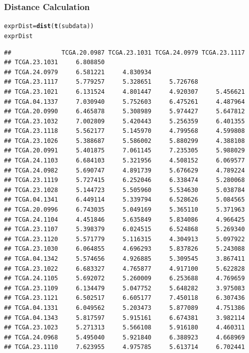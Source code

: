 \documentclass[UTF8]{beamer}\usepackage[]{graphicx}\usepackage[]{color}
\makeatletter
\newcommand{\hlstd}[1]{\textcolor[rgb]{0.345,0.345,0.345}{#1}}%
\newcommand{\hlkwb}[1]{\textcolor[rgb]{0.69,0.353,0.396}{#1}}%
\newcommand{\hlkwd}[1]{\textcolor[rgb]{0.737,0.353,0.396}{\textbf{#1}}}%
\newenvironment{kframe}{%
 \def\at@end@of@kframe{}%
 \ifinner\ifhmode%
  \def\at@end@of@kframe{\end{minipage}}%
  \begin{minipage}{\columnwidth}%
 \fi\fi%
 \def\FrameCommand##1{\hskip\@totalleftmargin \hskip-\fboxsep
 \colorbox{shadecolor}{##1}\hskip-\fboxsep
     \hskip-\linewidth \hskip-\@totalleftmargin \hskip\columnwidth}%
 \MakeFramed {\advance\hsize-\width
   \@totalleftmargin\z@ \linewidth\hsize
   \@setminipage}}%
 {\par\unskip\endMakeFramed%
 \at@end@of@kframe}
\newenvironment{knitrout}{}{} %
\makeatother
\begin{document}
\begin{frame}[fragile]
  \frametitle{Distance Calculation}
\tiny
\begin{knitrout}
\color{fgcolor}\begin{kframe}
\begin{alltt}
 \hlstd{exprDist} \hlkwb{=} \hlkwd{dist}\hlstd{(}\hlkwd{t}\hlstd{(subdata))}
 \hlstd{exprDist}
\end{alltt}
\begin{verbatim}
##              TCGA.20.0987 TCGA.23.1031 TCGA.24.0979 TCGA.23.1117
## TCGA.23.1031     6.808850                                       
## TCGA.24.0979     6.581221     4.830934                          
## TCGA.23.1117     5.779257     5.328651     5.726768             
## TCGA.23.1021     6.131524     4.801447     4.920307     5.456621
## TCGA.04.1337     7.030940     5.752603     6.475261     4.487964
## TCGA.20.0990     6.465878     5.308989     5.974427     5.647812
## TCGA.23.1032     7.002809     5.420443     5.256359     6.401355
## TCGA.23.1118     5.562177     5.145970     4.799568     4.599808
## TCGA.23.1026     5.388687     5.586002     5.880299     4.388108
## TCGA.20.0991     5.401875     7.061145     7.235305     5.988029
## TCGA.24.1103     6.684103     5.321956     4.508152     6.069577
## TCGA.24.0982     5.690747     4.891739     5.676629     4.789224
## TCGA.23.1119     5.727415     6.252046     6.338474     5.280068
## TCGA.23.1028     5.144723     5.505960     5.534630     5.038784
## TCGA.04.1341     6.449114     5.339794     6.528626     5.084565
## TCGA.20.0996     6.743035     5.049169     5.365110     5.371963
## TCGA.24.1104     4.451846     5.635849     5.834086     4.966425
## TCGA.23.1107     5.398379     6.024515     6.524868     5.269340
## TCGA.23.1120     5.571779     5.116315     4.304913     5.097922
## TCGA.23.1030     6.064855     4.696293     5.837826     5.243088
## TCGA.04.1342     5.574656     4.926885     5.309545     3.867411
## TCGA.23.1022     6.683327     4.765877     4.917100     5.622828
## TCGA.24.1105     5.692072     5.260009     6.253688     4.769659
## TCGA.23.1109     6.134479     5.047752     5.648282     3.975083
## TCGA.23.1121     6.502517     6.605177     7.450118     6.307436
## TCGA.04.1331     6.049562     5.203473     5.877089     4.751386
## TCGA.04.1343     5.817597     5.915161     6.674381     3.982114
## TCGA.23.1023     5.271313     5.566108     5.916180     4.460311
## TCGA.24.0968     5.495040     5.921840     6.388923     4.668969
## TCGA.23.1110     7.623955     4.975785     5.613714     6.702441

\end{verbatim}
\end{kframe}
\end{knitrout}
\end{frame}
\end{document}
